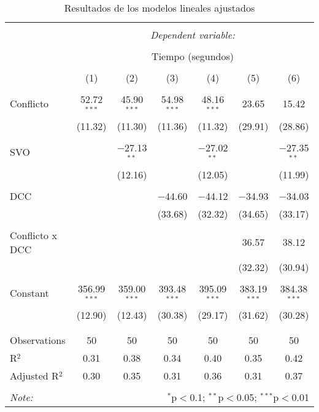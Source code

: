 
\begin{table}[!htbp] \centering 
  \caption{Resultados de los modelos lineales ajustados} 
  \label{} 
\begin{tabular}{@{\extracolsep{5pt}}lcccccc} 
\\[-1.8ex]\hline 
\hline \\[-1.8ex] 
 & \multicolumn{6}{c}{\textit{Dependent variable:}} \\ 
\cline{2-7} 
\\[-1.8ex] & \multicolumn{6}{c}{Tiempo (segundos)} \\ 
\\[-1.8ex] & (1) & (2) & (3) & (4) & (5) & (6)\\ 
\hline \\[-1.8ex] 
 Conflicto & 52.72$^{***}$ & 45.90$^{***}$ & 54.98$^{***}$ & 48.16$^{***}$ & 23.65 & 15.42 \\ 
  & (11.32) & (11.30) & (11.36) & (11.32) & (29.91) & (28.86) \\ 
  & & & & & & \\ 
 SVO &  & $-$27.13$^{**}$ &  & $-$27.02$^{**}$ &  & $-$27.35$^{**}$ \\ 
  &  & (12.16) &  & (12.05) &  & (11.99) \\ 
  & & & & & & \\ 
 DCC &  &  & $-$44.60 & $-$44.12 & $-$34.93 & $-$34.03 \\ 
  &  &  & (33.68) & (32.32) & (34.65) & (33.17) \\ 
  & & & & & & \\ 
 Conflicto x DCC &  &  &  &  & 36.57 & 38.12 \\ 
  &  &  &  &  & (32.32) & (30.94) \\ 
  & & & & & & \\ 
 Constant & 356.99$^{***}$ & 359.00$^{***}$ & 393.48$^{***}$ & 395.09$^{***}$ & 383.19$^{***}$ & 384.38$^{***}$ \\ 
  & (12.90) & (12.43) & (30.38) & (29.17) & (31.62) & (30.28) \\ 
  & & & & & & \\ 
\hline \\[-1.8ex] 
Observations & 50 & 50 & 50 & 50 & 50 & 50 \\ 
R$^{2}$ & 0.31 & 0.38 & 0.34 & 0.40 & 0.35 & 0.42 \\ 
Adjusted R$^{2}$ & 0.30 & 0.35 & 0.31 & 0.36 & 0.31 & 0.37 \\ 
\hline 
\hline \\[-1.8ex] 
\textit{Note:}  & \multicolumn{6}{r}{$^{*}$p$<$0.1; $^{**}$p$<$0.05; $^{***}$p$<$0.01} \\ 
\end{tabular} 
\end{table} 
